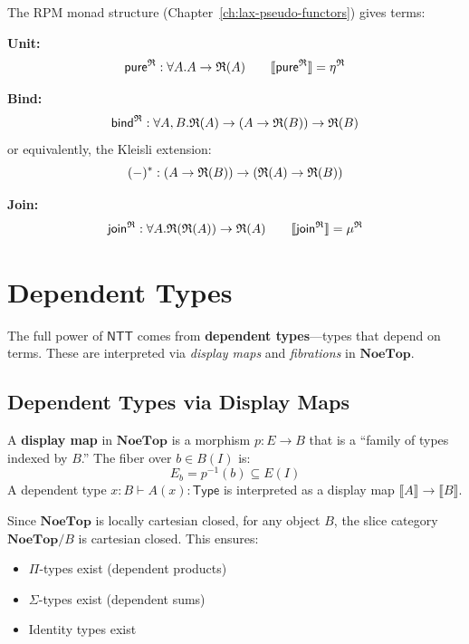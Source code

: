\begin{definition}
\label{def:rpm-monad-terms}
The RPM monad structure (Chapter~\ref{ch:lax-pseudo-functors}) gives terms:

\textbf{Unit:}
\[
  \mathsf{pure}^{\mathfrak{R}} : \forall A. A \to \mathfrak{R}(A)
  \qquad
  \llbracket \mathsf{pure}^{\mathfrak{R}} \rrbracket = \eta^{\mathfrak{R}}
\]

\textbf{Bind:}
\[
  \mathsf{bind}^{\mathfrak{R}} : \forall A, B. \mathfrak{R}(A) \to (A \to \mathfrak{R}(B)) \to \mathfrak{R}(B)
\]
or equivalently, the Kleisli extension:
\[
  (-)^* : (A \to \mathfrak{R}(B)) \to (\mathfrak{R}(A) \to \mathfrak{R}(B))
\]

\textbf{Join:}
\[
  \mathsf{join}^{\mathfrak{R}} : \forall A. \mathfrak{R}(\mathfrak{R}(A)) \to \mathfrak{R}(A)
  \qquad
  \llbracket \mathsf{join}^{\mathfrak{R}} \rrbracket = \mu^{\mathfrak{R}}
\]
\end{definition}

\section{Dependent Types}
\label{sec:dependent-types}

The full power of $\mathsf{NTT}$ comes from \textbf{dependent types}---types that
depend on terms. These are interpreted via \emph{display maps} and \emph{fibrations}
in $\mathbf{NoeTop}$.

\subsection{Dependent Types via Display Maps}
\label{subsec:display-maps}

\begin{definition}
\label{def:display-map}
A \textbf{display map} in $\mathbf{NoeTop}$ is a morphism $p : E \to B$ that is
a ``family of types indexed by $B$.'' The fiber over $b \in B(I)$ is:
\[
  E_b = p^{-1}(b) \subseteq E(I)
\]
A dependent type $x : B \vdash A(x) : \mathsf{Type}$ is interpreted as a display map
$\llbracket A \rrbracket \to \llbracket B \rrbracket$.
\end{definition}

\begin{remark}
\label{rem:lccc}
Since $\mathbf{NoeTop}$ is locally cartesian closed, for any object $B$, the
slice category $\mathbf{NoeTop}/B$ is cartesian closed. This ensures:
\begin{itemize}
  \item $\Pi$-types exist (dependent products)
  \item $\Sigma$-types exist (dependent sums)
  \item Identity types exist
\end{itemize}
\end{remark}

